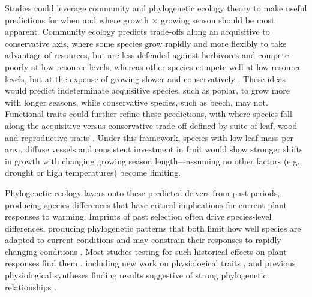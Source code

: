 \documentclass[11pt]{article}
\begin{document}
Studies could leverage community and phylogenetic ecology theory to make useful predictions for when and where growth $\times$ growing season should be most apparent. Community ecology predicts trade-offs along an acquisitive to conservative axis, where some species grow rapidly and more flexibly to take advantage of resources, but are less defended against herbivores and compete poorly at low resource levels, whereas other species compete well at low resource levels, but at the expense of growing slower and conservatively \citep[][]{Grime:1977sw}. These ideas would predict indeterminate acquisitive species, such as poplar, to grow more with longer seasons, while conservative species, such as beech, may not. Functional traits could further refine these predictions, with where species fall along the acquisitive versus conservative trade-off defined by suite of leaf, wood and reproductive traits \citep[][]{diaz2016}. Under this framework, species with low leaf mass per area, diffuse vessels and consistent investment in fruit would show stronger shifts in growth with changing growing season length---assuming no other factors (e.g., drought or high temperatures) become limiting.

Phylogenetic ecology layers onto these predicted drivers from past periods, producing species differences that have critical implications for current plant responses to warming. Imprints of past selection often drive species-level differences, producing phylogenetic patterns that both limit how well species are adapted to current conditions and may constrain their responses to rapidly changing conditions \citep{Ackerly:2009ly}.  %
Most studies testing for such historical effects on plant responses find them \citep[e.g.,][]{phenophylo}, including new work on physiological traits \citep{avila2023evidence}, and previous physiological syntheses finding results suggestive of strong phylogenetic relationships \citep[e.g.,][]{way2010differential}.
\end{document}
